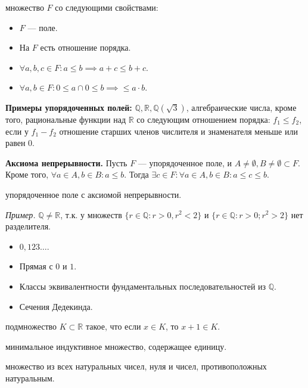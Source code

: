 \documentclass[12pt,a4paper]{article}
\begin{document}
 множество $F$ со следующими свойствами:

\begin{itemize}
	\item $F$ --- поле.
	\item На $F$ есть отношение порядка.
	\item $\forall a,b,c\in F: a\leqslant b\implies a+c\leqslant b+c$.
	\item $\forall a,b\in F:0\leqslant a\cap 0\leqslant b\implies \leqslant a\cdot b$.
\end{itemize}

\textbf{Примеры упорядоченных полей: } $\mathbb Q,\mathbb R,\mathbb Q(\sqrt3)$, алгебраические числа, кроме того, рациональные функции над $\mathbb R$ со следующим отношением порядка: $f_1\leqslant f_2$, если у $f_1-f_2$ отношение старших членов числителя и знаменателя меньше или равен 0.

\textbf{Аксиома непрерывности.} Пусть $F$ --- упорядоченное поле, и $A\neq\emptyset, B\neq\emptyset\subset F$. Кроме того, $\forall a\in A,b\in B:a\leqslant b$. Тогда $\exists c\in F:\forall a\in A,b\in B:a\leqslant c\leqslant b$.

 упорядоченное поле с аксиомой непрерывности.

\textit{Пример.} $\mathbb Q\neq \mathbb R$, т.к. у множеств $\{r\in \mathbb Q:r>0,r^2<2\}$ и $\{r\in \mathbb Q:r>0;r^2>2\}$ нет разделителя.\\


\begin{itemize}
	\item $0,123\ldots $.
	\item Прямая с $0$ и $1$.
	\item Классы эквивалентности фундаментальных последовательностей из $\mathbb Q$.
	\item Сечения Дедекинда.
\end{itemize}

\newpage

 подмножество $K\subset\mathbb R$ такое, что если $x\in K$, то $x+1\in K$.

 минимальное индуктивное множество, содержащее единицу.

 множество из всех натуральных чисел, нуля и чисел, противоположных натуральным.
\end{document}
